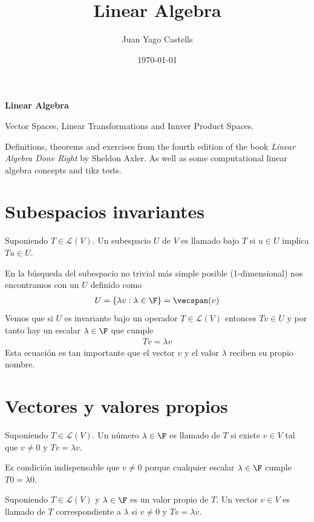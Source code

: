 \documentclass{scrartcl}
\title{Linear Algebra}
\author{Juan Yago Castells}
\date{\today}
\begin{document}
\textbf{\Large Linear Algebra}
\vspace*{0.5cm}

Vector Spaces, Linear Transformations and Innver Product Spaces.

Definitions, theorems and exercises from the fourth edition of the book \textit{Linear Algebra Done Right} by Sheldon Axler. As well as some computational linear algebra concepts and tikz tests.

\section{Subespacios invariantes}%

\begin{definition}
Suponiendo $T \in \mathcal{L}(V)$. Un subespacio $U$ de $V$ es llamado  bajo $T$ si $u \in U$ implica $Tu \in U$.
\end{definition}
En la búsqueda del subespacio no trivial más simple posible (1-dimensional) nos encontramos con un $U$ definido como
\begin{align*}
  U = \{ \lambda v : \lambda \in \F \} = \vecspan(v)
\end{align*}
Vemos que si $U$ es invariante bajo un operador $T\in \mathcal{L}(V)$ entonces $Tv \in U$ y por tanto hay un escalar $\lambda \in \F$ que cumple
\begin{align*}
  Tv = \lambda v
\end{align*}
Esta ecuación es tan importante que el vector $v$ y el valor $\lambda$ reciben su propio nombre.

\section{Vectores y valores propios}

\begin{definition}
  Suponiendo $T \in \mathcal{L}(V)$. Un número $\lambda \in \F$ es llamado  de $T$ si existe $v \in V$ tal que $v \neq 0$ y $Tv = \lambda v$.
\end{definition}

Es condición indispensable que $v \neq 0$ porque cualquier escalar $\lambda \in \F$ cumple $T0 = \lambda 0$.

\begin{definition}
  Suponiendo $T \in \mathcal{L}(V)$ y $\lambda \in \F$ es un valor propio de $T$. Un vector $v \in V$ es llamado  de $T$ correspondiente a $\lambda$ si $v \neq 0$ y $Tv = \lambda v$.
\end{definition}
\end{document}
